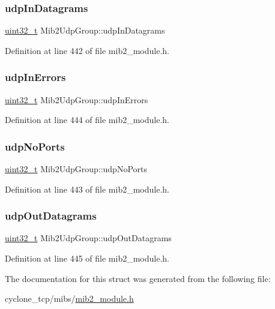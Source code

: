 \subsubsection{\texorpdfstring{udp\+In\+Datagrams}{udpInDatagrams}}
{\footnotesize\ttfamily \hyperlink{stdint_8h_a435d1572bf3f880d55459d9805097f62}{uint32\+\_\+t} Mib2\+Udp\+Group\+::udp\+In\+Datagrams}



Definition at line 442 of file mib2\+\_\+module.\+h.

\mbox{\label{structMib2UdpGroup_a4eb62a75eb25a63961d965e010b01653}} 
\subsubsection{\texorpdfstring{udp\+In\+Errors}{udpInErrors}}
{\footnotesize\ttfamily \hyperlink{stdint_8h_a435d1572bf3f880d55459d9805097f62}{uint32\+\_\+t} Mib2\+Udp\+Group\+::udp\+In\+Errors}



Definition at line 444 of file mib2\+\_\+module.\+h.

\mbox{\label{structMib2UdpGroup_aabbaf766fb874d55202ccb7152a92de6}} 
\subsubsection{\texorpdfstring{udp\+No\+Ports}{udpNoPorts}}
{\footnotesize\ttfamily \hyperlink{stdint_8h_a435d1572bf3f880d55459d9805097f62}{uint32\+\_\+t} Mib2\+Udp\+Group\+::udp\+No\+Ports}



Definition at line 443 of file mib2\+\_\+module.\+h.

\mbox{\label{structMib2UdpGroup_a9ca4aa4e3230b318210bf1a9e13104ac}} 
\subsubsection{\texorpdfstring{udp\+Out\+Datagrams}{udpOutDatagrams}}
{\footnotesize\ttfamily \hyperlink{stdint_8h_a435d1572bf3f880d55459d9805097f62}{uint32\+\_\+t} Mib2\+Udp\+Group\+::udp\+Out\+Datagrams}



Definition at line 445 of file mib2\+\_\+module.\+h.



The documentation for this struct was generated from the following file\+:\begin{DoxyCompactItemize}
\item 
cyclone\+\_\+tcp/mibs/\hyperlink{mib2__module_8h}{mib2\+\_\+module.\+h}\end{DoxyCompactItemize}
